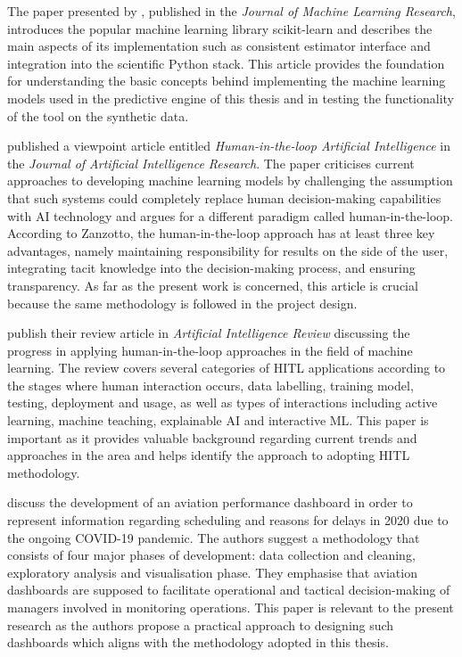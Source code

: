 The paper presented by \citet{Pedregosa2011}, published in the \textit{Journal of Machine Learning Research}, introduces the popular machine learning library scikit-learn and describes the main aspects of its implementation such as consistent estimator interface and integration into the scientific Python stack. This article provides the foundation for understanding the basic concepts behind implementing the machine learning models used in the predictive engine of this thesis and in testing the functionality of the tool on the synthetic data.

\citet{Zanzotto2019} published a viewpoint article entitled \emph{Human-in-the-loop Artificial Intelligence} in the \textit{Journal of Artificial Intelligence Research}. The paper criticises current approaches to developing machine learning models by challenging the assumption that such systems could completely replace human decision-making capabilities with AI technology and argues for a different paradigm called human-in-the-loop. According to Zanzotto, the human-in-the-loop approach has at least three key advantages, namely maintaining responsibility for results on the side of the user, integrating tacit knowledge into the decision-making process, and ensuring transparency. As far as the present work is concerned, this article is crucial because the same methodology is followed in the project design.

\citet{MosqueiraRey2023} publish their review article in \textit{Artificial Intelligence Review} discussing the progress in applying human-in-the-loop approaches in the field of machine learning. The review covers several categories of HITL applications according to the stages where human interaction occurs, data labelling, training model, testing, deployment and usage, as well as types of interactions including active learning, machine teaching, explainable AI and interactive ML. This paper is important as it provides valuable background regarding current trends and approaches in the area and helps identify the approach to adopting HITL methodology.

\citet{Salleh2023} discuss the development of an aviation performance dashboard in order to represent information regarding scheduling and reasons for delays in 2020 due to the ongoing COVID-19 pandemic. The authors suggest a methodology that consists of four major phases of development: data collection and cleaning, exploratory analysis and visualisation phase. They emphasise that aviation dashboards are supposed to facilitate operational and tactical decision-making of managers involved in monitoring operations. This paper is relevant to the present research as the authors propose a practical approach to designing such dashboards which aligns with the methodology adopted in this thesis.

